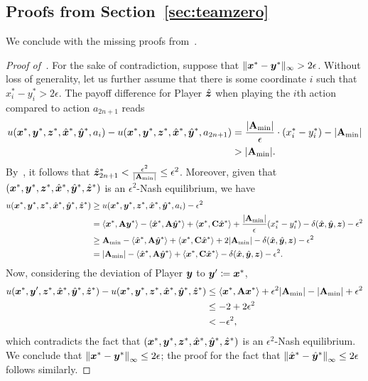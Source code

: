 

\subsection{Proofs from Section~\ref{sec:teamzero}}
\label{sec:proofs4}

We conclude with the missing proofs from~.

\begin{proof}[Proof of~]
    For the sake of contradiction, suppose that $\|{\bm{x}}^* - {\bm{y}}^*\|_\infty > 2 \epsilon$. Without loss of generality, let us further assume that there is some coordinate $i$ such that $x_i^* - y_i^* > 2 \epsilon$. The payoff difference for Player $\hat{{\bm{z}}}$ when playing the $i$th action compared to action $a_{2n + 1}$ reads
    \begin{align*}
        u({\bm{x}}^*, {\bm{y}}^*, {\bm{z}}^*, \hat{{\bm{x}}}^*, \hat{{\bm{y}}}^*, a_i) - u({\bm{x}}^*, {\bm{y}}^*, {\bm{z}}^*, \hat{{\bm{x}}}^*, \hat{{\bm{y}}}^*, a_{2n + 1}) & = \frac{|\mathbf{A}_{\min}|}{\epsilon} \cdot (x^*_i - y^*_i) - |\mathbf{A}_{\min}| \\
        & > |\mathbf{A}_{\min}|.
    \end{align*}
    By~, it follows that $\hat{{\bm{z}}}_{2n+1}^* < \frac{\epsilon^2}{|\mathbf{A}_{\min}|} \leq \epsilon^2$. Moreover, given that $({\bm{x}}^*, {\bm{y}}^*, {\bm{z}}^*, \hat{{\bm{x}}}^*, \hat{{\bm{y}}}^*, \hat{{\bm{z}}}^*)$ is an $\epsilon^2$-Nash equilibrium, we have
\begin{align*}
        u({\bm{x}}^*, {\bm{y}}^*, {\bm{z}}^*, \hat{{\bm{x}}}^*, \hat{{\bm{y}}}^*, \hat{{\bm{z}}}^*) & \geq u({\bm{x}}^*, {\bm{y}}^*, {\bm{z}}^*, \hat{{\bm{x}}}^*, \hat{{\bm{y}}}^*, a_i) - \epsilon^2 \\
        & = \langle {\bm{x}}^*, \mathbf{A} {\bm{y}}^* \rangle  - \langle \hat{{\bm{x}}}^*, \mathbf{A} \hat{{\bm{y}}}^* \rangle + \langle {\bm{x}}^*, \mathbf{C} \hat{{\bm{x}}}^* \rangle  + \frac{|\mathbf{A}_{\min}|}{\epsilon}(x^*_i - y^*_i) - \delta(\hat{{\bm{x}}}, \hat{{\bm{y}}}, {\bm{z}}) - \epsilon^2 \\
        & \geq \mathbf{A}_{\min} - \langle \hat{{\bm{x}}}^*, \mathbf{A} \hat{{\bm{y}}}^* \rangle + \langle {\bm{x}}^*, \mathbf{C} \hat{{\bm{x}}}^* \rangle + 2 |\mathbf{A}_{\min}| - \delta(\hat{{\bm{x}}}, \hat{{\bm{y}}}, {\bm{z}}) - \epsilon^2 \\
        & = |\mathbf{A}_{\min}| - \langle \hat{{\bm{x}}}^*, \mathbf{A} \hat{{\bm{y}}}^* \rangle  + \langle {\bm{x}}^*, \mathbf{C} \hat{{\bm{x}}}^* \rangle   - \delta(\hat{{\bm{x}}}, \hat{{\bm{y}}}, {\bm{z}}) - \epsilon^2.
\end{align*}
Now, considering the deviation of Player ${\bm{y}}$ to ${\bm{y}}' \coloneqq {\bm{x}}^*$,
\begin{align*}
        u({\bm{x}}^*, {\bm{y}}', {\bm{z}}^*, \hat{{\bm{x}}}^*, \hat{{\bm{y}}}^*, \hat{{\bm{z}}}^*) - u({\bm{x}}^*, {\bm{y}}^*, {\bm{z}}^*, \hat{{\bm{x}}}^*, \hat{{\bm{y}}}^*, \hat{{\bm{z}}}^*) & \leq \langle {\bm{x}}^*, \mathbf{A} {\bm{x}}^* \rangle + \epsilon^2 |\mathbf{A}_{\min}| - |\mathbf{A}_{\min}| + \epsilon^2 \\
        &\leq -2 + 2 \epsilon^2 \\
        &< - \epsilon^2,
    \end{align*}
    which contradicts the fact that $({\bm{x}}^*, {\bm{y}}^*, {\bm{z}}^*, \hat{{\bm{x}}}^*, \hat{{\bm{y}}}^*, \hat{{\bm{z}}}^*)$ is an $\epsilon^2$-Nash equilibrium. We conclude that $\left\| {\bm{x}}^* - {\bm{y}}^* \right\|_{\infty} \leq 2 \epsilon$; the proof for the fact that $\left\| \hat{{\bm{x}}}^* - \hat{{\bm{y}}}^* \right\|_{\infty} \leq 2\epsilon$ follows similarly.
\end{proof}

